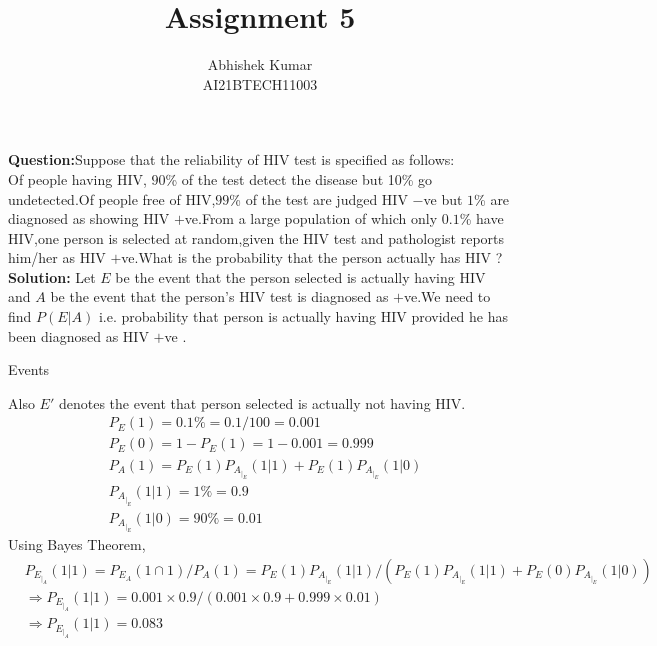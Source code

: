 \documentclass[journal, 8pt, twocolumn]{IEEEtran}
\title{Assignment 5 \\}
\author{Abhishek Kumar\\AI21BTECH11003}
\begin{document}
	\maketitle
	\textbf{Question:}Suppose that the reliability of HIV test is specified as follows:\\
	Of people having HIV, $90$\% of the test detect the disease but 10\% go undetected.Of people free of HIV,$99$\% of the test are judged HIV $-$ve but $1$\% are diagnosed as showing HIV $+$ve.From a large population of which only $0.1$\% have HIV,one person is selected at random,given the HIV test and pathologist reports him/her as HIV $+$ve.What is the probability that the person actually has HIV ?\\
	
	
	\textbf{Solution:}
	Let $E$ be the event that the person selected is actually having HIV and $A$ be the event that the person's HIV test is diagnosed as $+$ve.We need to find $P(E|A)$ i.e. probability that person is actually having HIV provided he has been diagnosed as HIV $+$ve .
	
	\begin{table}[ht!]
		\centering
		
		\caption{Events}
		\label{Table:1}
	\end{table}
	
	
	Also    $E'$ denotes the event that person selected is actually not having HIV.
	\begin{align}
	&P_E(1)=0.1\%=0.1/100=0.001\\
	&P_E(0)=1-P_E(1)=1-0.001=0.999\\
	&P_A(1)=P_E(1)P_A_|_E(1|1)+P_E(1)P_A_|_E(1|0)\\
	&P_A_|_E(1|1)=1\%=0.9\\
	&P_A_|_E(1|0)=90\%=0.01
	\end{align}
	Using Bayes Theorem,
	\begin{align}
	    &P_E_|_A(1|1)=P_E_A(1 \cap 1)/P_A(1)=P_E(1)P_A_|_E(1|1)/(P_E(1)P_A_|_E(1|1)+P_E(0)P_A_|_E(1|0))\\
	    &\Rightarrow P_E_|_A(1|1)=0.001\times0.9/(0.001\times0.9+0.999\times0.01)\\
	    &\Rightarrow P_E_|_A(1|1)=0.083 
	\end{align}
	
\end{document}
